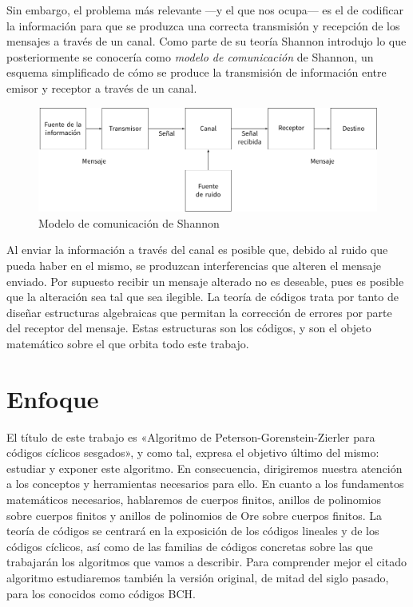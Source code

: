Sin embargo, el problema más relevante —y el que nos ocupa— es el de codificar la información para que se produzca una correcta transmisión y recepción de los mensajes a través de un canal.
Como parte de su teoría Shannon introdujo lo que posteriormente se conocería como \emph{modelo de comunicación} de Shannon, un esquema simplificado de cómo se produce la transmisión de información entre emisor y receptor a través de un canal.
\begin{figure}
  \includegraphics[width=\textwidth]{assets/shannon-communication-model.pdf}
  \caption*{Modelo de comunicación de Shannon}
\end{figure}
Al enviar la información a través del canal es posible que, debido al ruido que pueda haber en el mismo, se produzcan interferencias que alteren el mensaje enviado.
Por supuesto recibir un mensaje alterado no es deseable, pues es posible que la alteración sea tal que sea ilegible.
La teoría de códigos trata por tanto de diseñar estructuras algebraicas que permitan la corrección de errores por parte del receptor del mensaje.
Estas estructuras son los códigos, y son el objeto matemático sobre el que orbita todo este trabajo.


\section*{Enfoque}

El título de este trabajo es «Algoritmo de Peterson-Gorenstein-Zierler para códigos cíclicos sesgados», y como tal, expresa el objetivo último del mismo: estudiar y exponer este algoritmo.
En consecuencia, dirigiremos nuestra atención a los conceptos y herramientas necesarios para ello.
En cuanto a los fundamentos matemáticos necesarios, hablaremos de cuerpos finitos, anillos de polinomios sobre cuerpos finitos y anillos de polinomios de Ore sobre cuerpos finitos.
La teoría de códigos se centrará en la exposición de los códigos lineales y de los códigos cíclicos, así como de las familias de códigos concretas sobre las que trabajarán los algoritmos que vamos a describir.
Para comprender mejor el citado algoritmo estudiaremos también la versión original, de mitad del siglo pasado, para los conocidos como códigos BCH.

